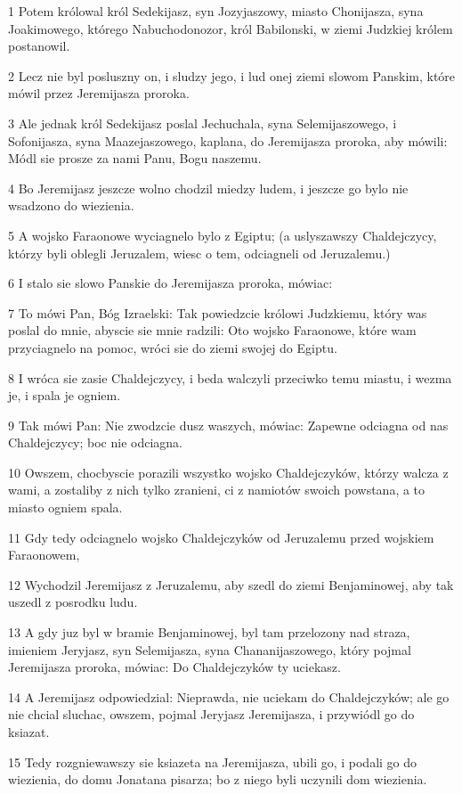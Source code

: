 \par 1 Potem królowal król Sedekijasz, syn Jozyjaszowy, miasto Chonijasza, syna Joakimowego, którego Nabuchodonozor, król Babilonski, w ziemi Judzkiej królem postanowil.
\par 2 Lecz nie byl posluszny on, i sludzy jego, i lud onej ziemi slowom Panskim, które mówil przez Jeremijasza proroka.
\par 3 Ale jednak król Sedekijasz poslal Jechuchala, syna Selemijaszowego, i Sofonijasza, syna Maazejaszowego, kaplana, do Jeremijasza proroka, aby mówili: Módl sie prosze za nami Panu, Bogu naszemu.
\par 4 Bo Jeremijasz jeszcze wolno chodzil miedzy ludem, i jeszcze go bylo nie wsadzono do wiezienia.
\par 5 A wojsko Faraonowe wyciagnelo bylo z Egiptu; (a uslyszawszy Chaldejczycy, którzy byli oblegli Jeruzalem, wiesc o tem, odciagneli od Jeruzalemu.)
\par 6 I stalo sie slowo Panskie do Jeremijasza proroka, mówiac:
\par 7 To mówi Pan, Bóg Izraelski: Tak powiedzcie królowi Judzkiemu, który was poslal do mnie, abyscie sie mnie radzili: Oto wojsko Faraonowe, które wam przyciagnelo na pomoc, wróci sie do ziemi swojej do Egiptu.
\par 8 I wróca sie zasie Chaldejczycy, i beda walczyli przeciwko temu miastu, i wezma je, i spala je ogniem.
\par 9 Tak mówi Pan: Nie zwodzcie dusz waszych, mówiac: Zapewne odciagna od nas Chaldejczycy; boc nie odciagna.
\par 10 Owszem, chocbyscie porazili wszystko wojsko Chaldejczyków, którzy walcza z wami, a zostaliby z nich tylko zranieni, ci z namiotów swoich powstana, a to miasto ogniem spala.
\par 11 Gdy tedy odciagnelo wojsko Chaldejczyków od Jeruzalemu przed wojskiem Faraonowem,
\par 12 Wychodzil Jeremijasz z Jeruzalemu, aby szedl do ziemi Benjaminowej, aby tak uszedl z posrodku ludu.
\par 13 A gdy juz byl w bramie Benjaminowej, byl tam przelozony nad straza, imieniem Jeryjasz, syn Selemijasza, syna Chananijaszowego, który pojmal Jeremijasza proroka, mówiac: Do Chaldejczyków ty uciekasz.
\par 14 A Jeremijasz odpowiedzial: Nieprawda, nie uciekam do Chaldejczyków; ale go nie chcial sluchac, owszem, pojmal Jeryjasz Jeremijasza, i przywiódl go do ksiazat.
\par 15 Tedy rozgniewawszy sie ksiazeta na Jeremijasza, ubili go, i podali go do wiezienia, do domu Jonatana pisarza; bo z niego byli uczynili dom wiezienia.
